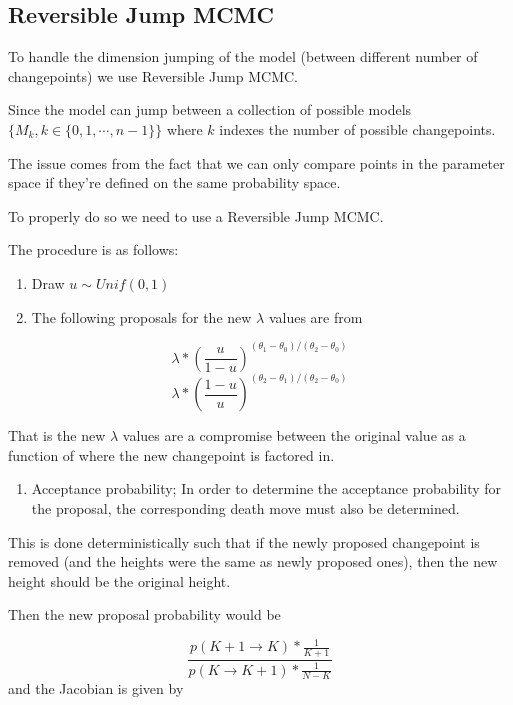 \documentclass[]{article}
\providecommand{\tightlist}{%
  \setlength{\itemsep}{0pt}\setlength{\parskip}{0pt}}
\numberwithin{equation}{section}
\begin{document}
\hypertarget{reversible-jump-mcmc}{%
\subsection{Reversible Jump MCMC}\label{reversible-jump-mcmc}}

To handle the dimension jumping of the model (between different number
of changepoints) we use Reversible Jump MCMC.

Since the model can jump between a collection of possible models
\(\{M_k, k \in \{0,1,\cdots,n-1\}\}\) where \(k\) indexes the number of
possible changepoints.

The issue comes from the fact that we can only compare points in the
parameter space if they're defined on the same probability space.

To properly do so we need to use a Reversible Jump MCMC.

The procedure is as follows:

\begin{enumerate}
\def\labelenumi{\arabic{enumi}.}
\tightlist
\item
  Draw \(u \sim Unif(0,1)\)
\item
  The following proposals for the new \(\lambda\) values are from
\end{enumerate}

\[\lambda*(\frac{u}{1-u})^{(\theta_1-\theta_0)/(\theta_2-\theta_0)}\]
\[\lambda*(\frac{1-u}{u})^{(\theta_2-\theta_1)/(\theta_2-\theta_0)}\]

That is the new \(\lambda\) values are a compromise between the original
value as a function of where the new changepoint is factored in.

\begin{enumerate}
\def\labelenumi{\arabic{enumi}.}
\setcounter{enumi}{2}
\tightlist
\item
  Acceptance probability; In order to determine the acceptance
  probability for the proposal, the corresponding death move must also
  be determined.
\end{enumerate}

This is done deterministically such that if the newly proposed
changepoint is removed (and the heights were the same as newly proposed
ones), then the new height should be the original height.

Then the new proposal probability would be

\[ \frac{p({K+1 \rightarrow K})*\frac{1}{K+1}}{p(K\rightarrow K+1)*\frac{1}{N-K}} \]
and the Jacobian is given by
\end{document}
